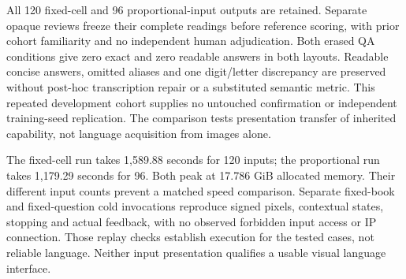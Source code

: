 All 120 fixed-cell and 96 proportional-input outputs are retained. Separate
opaque reviews freeze their complete readings before reference scoring, with
prior cohort familiarity and no independent human adjudication. Both erased
QA conditions give zero exact and zero readable answers in both layouts.
Readable concise answers, omitted aliases and one digit/letter discrepancy
are preserved without post-hoc transcription repair or a substituted semantic
metric. This repeated development cohort supplies no untouched confirmation
or independent training-seed replication. The comparison tests presentation
transfer of inherited capability, not language acquisition from images alone.

The fixed-cell run takes 1,589.88 seconds for 120 inputs; the proportional
run takes 1,179.29 seconds for 96. Both peak at 17.786 GiB allocated memory.
Their different input counts prevent a matched speed comparison. Separate
fixed-book and fixed-question cold invocations reproduce signed pixels,
contextual states, stopping and actual feedback, with no observed forbidden
input access or IP connection. Those replay checks establish execution for
the tested cases, not reliable language. Neither input presentation qualifies
a usable visual language interface.


